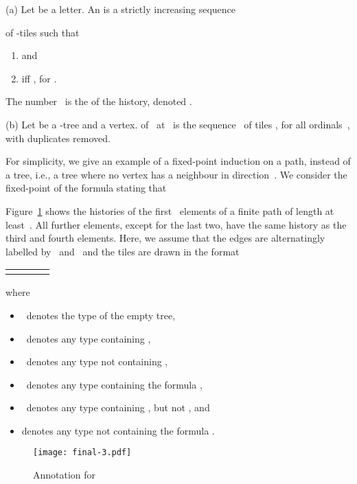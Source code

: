 \documentclass{LMCS}
\begin{document}
\begin{defi}
\textup{(a)}
Let  be a letter.
An  is a strictly increasing sequence

of -tiles such that
\begin{enumerate}
\item  and
\item  iff , for .
\end{enumerate}
The number~ is the  of the history, denoted .

\textup{(b)}
Let  be a -tree and  a vertex.
 of~ at~
is the sequence~ of tiles ,
for all ordinals~, with duplicates removed.
\end{defi}

\begin{exa}\label{ex:paths}
For simplicity, we give an example of a fixed-point induction on
a path, instead of a tree, i.e., a tree where no vertex has a neighbour
in direction~.
We consider the fixed-point of the formula 
stating that

Figure~\ref{fig:annotated word} shows the histories of the
first ~elements of a finite path of length at least~.
All further elements, except for the last two,
have the same history as the third and fourth elements.
Here, we assume that the edges are alternatingly labelled by ~and~
and the tiles are drawn in the format
\begin{center}
\begin{tabular}{|c|c|c|c|}
\hline
&&&\\
\hline
&&&\\
\hline
\end{tabular}
\end{center}
where
\begin{itemize}\parskip=0pt\itemsep=0pt\item ~denotes the type of the empty tree,
\item ~denotes any type containing ,
\item ~denotes any type not containing ,
\item ~denotes any type containing the formula ,
\item ~denotes any type containing ,
  but not , and
\item  denotes any type not containing the formula . 
\end{itemize}
\begin{figure}\centering
\texttt{[image: final-3.pdf]}
\caption{Annotation for \label{fig:annotated word}}
\end{figure}
\end{exa}
\end{document}

